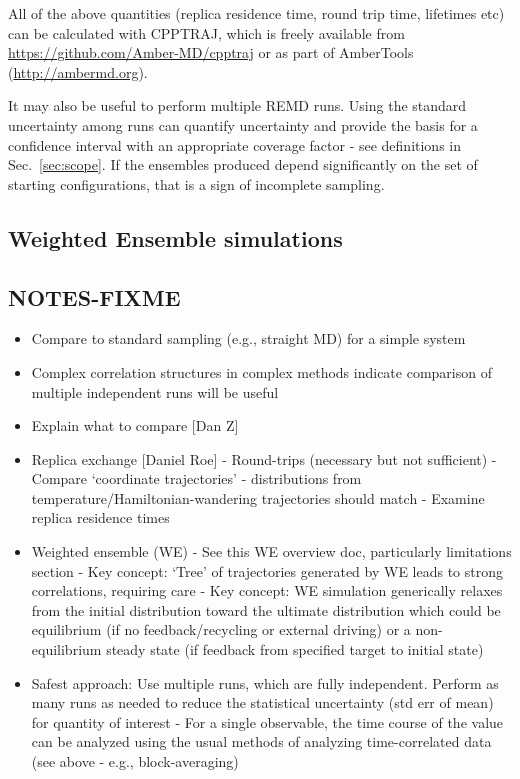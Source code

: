 All of the above quantities (replica residence time, round trip time, lifetimes etc) can be calculated with CPPTRAJ,\citep{Roe2013} which is freely available from \url{https://github.com/Amber-MD/cpptraj} or as part of AmberTools (\url{http://ambermd.org}).

It may also be useful to perform multiple REMD runs.  Using the standard uncertainty among runs can quantify uncertainty and provide the basis for a confidence interval with an appropriate coverage factor - see definitions in Sec.\ \ref{sec:scope}.  If the ensembles produced depend significantly on the set of starting configurations, that is a sign of incomplete sampling.

\subsection{Weighted Ensemble simulations}

\subsection{NOTES-FIXME}
\begin{itemize}
  \item Compare to standard sampling (e.g., straight MD) for a simple system
  \item Complex correlation structures in complex methods indicate comparison of multiple independent runs will be useful
  \item Explain what to compare [Dan Z]
  \item Replica exchange [Daniel Roe]
    - Round-trips (necessary but not sufficient)
    - Compare ‘coordinate trajectories’ - distributions from temperature/Hamiltonian-wandering trajectories should match
    - Examine replica residence times
  \item Weighted ensemble (WE)
    - See this WE overview doc, particularly limitations section
    - Key concept: ‘Tree’ of trajectories generated by WE leads to strong correlations, requiring care
    - Key concept: WE simulation generically relaxes from the initial distribution toward the ultimate distribution which could be equilibrium (if no feedback/recycling or external driving) or a non-equilibrium steady state (if feedback from specified target to initial state)
  \item Safest approach: Use multiple runs, which are fully independent.  Perform as many runs as needed to reduce the statistical uncertainty (std err of mean) for quantity of interest
    - For a single observable, the time course of the value can be analyzed using the usual methods of analyzing time-correlated data (see above - e.g., block-averaging)
\end{itemize}
